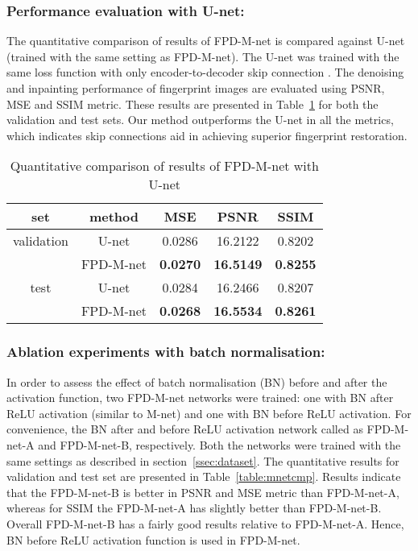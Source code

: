 \documentclass{llncs}
\begin{document}
\subsubsection{Performance evaluation with U-net:}
\label{sssec:unet}
The quantitative comparison of results of FPD-M-net is compared against U-net (trained with the same setting as FPD-M-net). The U-net was trained with the same loss function with only encoder-to-decoder skip connection \cite{ronneberger2015u}. The denoising and inpainting performance of fingerprint images are evaluated using PSNR, MSE and SSIM metric. These results are presented in Table~\ref{table:unetcmp} for both the validation and test sets. Our method outperforms the U-net in all the metrics, which indicates skip connections aid in achieving superior fingerprint restoration.

\begin{table}[h!]
\centering
\addtolength{\tabcolsep}{10pt}
\begin{tabular}{ c | c | c | c | c }
    \hline \hline
    set        & method    & MSE    & PSNR    & SSIM   \\ \hline \hline
    validation & U-net     & 0.0286 & 16.2122 & 0.8202 \\
               & FPD-M-net & \textbf{0.0270} & \textbf{16.5149} & \textbf{0.8255} \\
    \hline
    test       & U-net     & 0.0284 & 16.2466 & 0.8207 \\
               & FPD-M-net & \textbf{0.0268} & \textbf{16.5534} & \textbf{0.8261} \\ \hline\hline
\end{tabular}
\caption{Quantitative comparison of results of FPD-M-net with U-net}
\label{table:unetcmp}
\end{table}

\subsubsection{Ablation experiments with batch normalisation:}
\label{sssec:BN}
In order to assess the effect of batch normalisation (BN) before and after the activation function, two FPD-M-net networks were trained: one with BN after ReLU activation (similar to M-net) and one with BN before ReLU activation. For convenience, the BN after and before ReLU activation network called as FPD-M-net-A and FPD-M-net-B, respectively. Both the networks were trained with the same settings as described in section~\ref{ssec:dataset}. The quantitative results for validation and test set are presented in Table~\ref{table:mnetcmp}. Results indicate that the FPD-M-net-B is better in PSNR and MSE metric than FPD-M-net-A, whereas for SSIM the FPD-M-net-A has slightly better than FPD-M-net-B. Overall FPD-M-net-B has a fairly good results relative to FPD-M-net-A. Hence, BN before ReLU activation function is used in FPD-M-net.
\end{document}
